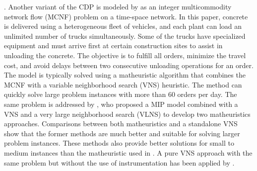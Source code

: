 \documentclass{article}
\begin{document}
\cite{garza2021dynamic}. Another variant of the CDP is modeled by \cite{schmid2009hybrid} as an integer multicommodity network flow (MCNF) problem on a time-space network. In this paper, concrete is delivered using a heterogeneous fleet of vehicles, and each plant can load an unlimited number of trucks simultaneously. Some of the trucks have specialized equipment and must arrive first at certain construction sites to assist in unloading the concrete. The objective is to fulfill all orders, minimize the travel cost, and avoid delays between two consecutive unloading operations for an order. The model is typically solved using a matheuristic algorithm that combines the MCNF with a variable neighborhood search (VNS) heuristic. The method can quickly solve large problem instances with more than 60 orders per day. The same problem is addressed by \cite{schmid2010hybridization}, who proposed a MIP model combined with a VNS and a very large neighborhood search (VLNS) to develop two matheuristics approaches. Comparisons between both matheuristics and a standalone VNS show that the former methods are much better and suitable for solving larger problem instances. These methods also provide better solutions for small to medium instances than the matheuristic used in \cite{schmid2009hybrid}. A pure VNS approach with the same problem but without the use of instrumentation has been applied by \cite{payr2009optimizing}.
\end{document}
